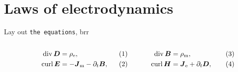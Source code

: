 \documentclass[11pt,a4paper,twoside,openany]{report}
\begin{document}
    \section{Laws of electrodynamics}
    \label{sec:first-section}
        Lay out \texttt{the equations}, brr\\
        \begin{subequations}
            \label{eq:maxwell-general}
            \noindent\centering
            \begin{minipage}{0.45\textwidth}
                \begin{align}
                    \label{maxwell-general-div-d}
                    \Div\vec D &= \rho_{\mathrm e},
                \\
                    \label{maxwell-general-curl-e}
                    \Curl\vec E &= -\vec J_{\mathrm m} - \partial_t\vec B,
                \end{align}
            \end{minipage}
            \hfill
            \begin{minipage}{0.45\textwidth}
                \begin{align}
                    \label{maxwell-general-div-b}
                    \Div\vec B &= \rho_{\mathrm m},
                \\
                    \label{maxwell-general-curl-h}
                    \Curl\vec H &= \vec J_{\mathrm e} + \partial_t\vec D,
                \end{align}
            \end{minipage}
        \end{subequations}\\%
\end{document}
